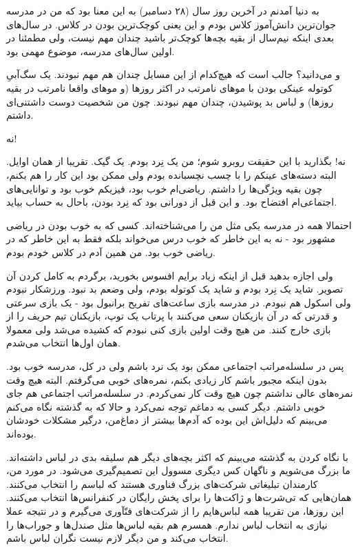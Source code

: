 به دنیا آمدنم در آخرین روز سال (۲۸ دسامبر) به این معنا بود که من در
مدرسه جوان‌ترین دانش‌آموز کلاس بودم و این یعنی کوچک‌ترین بودن در کلاس. در
سال‌های بعدی اینکه نیم‌سال از بقیه بچه‌ها کوچک‌تر باشید چندان مهم نیست،
ولی مطمئنا در اولین سال‌های مدرسه، موضوع مهمی بود.

و می‌دانید؟ جالب است که هیچ‌کدام از این مسایل چندان هم مهم نبودند. یک
سگ‌آبیِ کوتوله عینکی بودن با موهای نامرتب در اکثر روزها (و موهای واقعا
نامرتب در بقیه روزها) و لباس بد پوشیدن، چندان مهم نبودند. چون من شخصیت
دوست داشتنی‌ای داشتم.

نه!

نه! بگذارید با این حقیقت روبرو شوم؛ من یک نِرد بودم. یک گیک. تقریبا از
همان اوایل. البته دسته‌های عینکم را با چسب نچسبانده بودم ولی ممکن بود
این کار را هم بکنم، چون بقیه ویژگی‌ها را داشتم. ریاضی‌ام خوب بود، فیزیکم
خوب بود و توانایی‌های اجتماعی‌ام افتضاح بود. و این قبل از دورانی بود که
نِرد بودن، باحال به حساب بیاید.

احتمالا همه در مدرسه یکی مثل من را می‌شناخته‌اند. کسی که به خوب بودن در
ریاضی مشهور بود - نه به این خاطر که خوب درس می‌خواند بلکه فقط به این
خاطر که در ریاضی خوب بود. من همین آدم در کلاس خودم بودم.

ولی اجازه بدهید قبل از اینکه زیاد برایم افسوس بخورید، برگردم به کامل
کردن آن تصویر. شاید یک نِرد بودم و شاید یک کوتوله بودم، ولی وضعم بد
نبود. ورزشکار نبودم ولی اسکول هم نبودم. در مدرسه بازی ساعت‌های تفریح
برانبول
 بود - یک بازی سرعتی و قدرتی که در آن
بازیکنان سعی می‌کنند با پرتاب یک توپ، بازیکنان تیم حریف را از بازی خارج
کنند. من هیچ وقت اولین بازی کنی نبودم که کشیده می‌شد ولی معمولا همان
اول‌ها انتخاب می‌شدم.

پس در سلسله‌مراتب اجتماعی ممکن بود یک نرد باشم ولی در کل، مدرسه خوب
بود. بدون اینکه مجبور باشم کار زیادی بکنم، نمره‌های خوبی می‌گرفتم. البته
هیچ وقت نمره‌های عالی نداشتم چون هیچ وقت کار نمی‌کردم. در سلسله‌مراتب
اجتماعی هم جای خوبی داشتم. دیگر کسی به دماغم توجه نمی‌کرد و حالا که به
گذشته نگاه می‌کنم می‌بینم که دلیل‌اش این بوده که آدم‌ها بیشتر از دماغ‌من،
درگیر مشکلات خودشان بوده‌اند.

با نگاه کردن به گذشته می‌بینم که اکثر بچه‌های دیگر هم سلیقه بدی در لباس
داشته‌اند. ما بزرگ می‌شویم و ناگهان کس دیگری مسوول این تصمیم‌گیری
می‌شود. در مورد من، کارمندان تبلیغاتی شرکت‌های بزرگ فناوری هستند که
لباسم را انتخاب می‌کنند. همان‌هایی که تی‌شرت‌ها و ژاکت‌ها را برای پخش
رایگان در کنفرانس‌ها انتخاب می‌کنند. این روزها، من تقریبا همه لباس‌هایم
را از شرکت‌های فنّآوری می‌گیرم و در نتیجه عملا نیازی به انتخاب لباس
ندارم. همسرم هم بقیه لباس‌ها مثل صندل‌ها و جوراب‌ها را انتخاب می‌کند و من
دیگر لازم نیست نگران لباس باشم.

